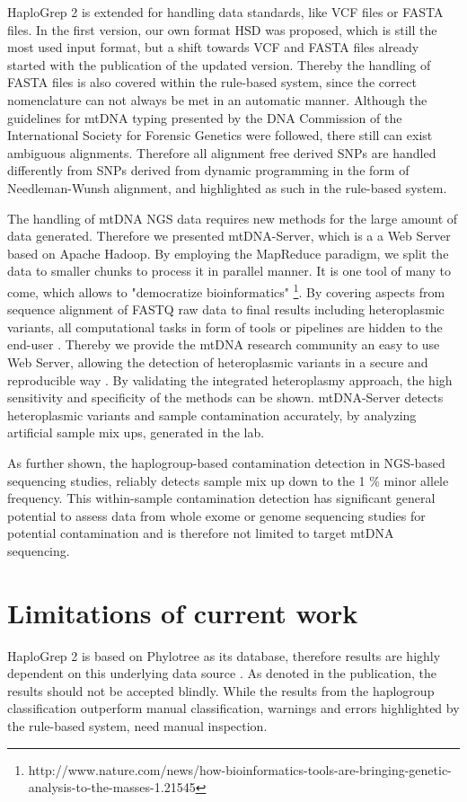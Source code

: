 HaploGrep 2 is extended for handling data standards, like VCF files or FASTA files. In the first version, our own format HSD was proposed, which is still the most used input format, but a shift towards VCF and FASTA files already started with the publication of the updated version. Thereby the handling of FASTA files is also covered within the rule-based system, since the correct nomenclature can not always be met in an automatic manner.  Although the guidelines for mtDNA typing presented by the DNA Commission of the International Society for Forensic Genetics \cite{Parson2014} were followed, there still can exist ambiguous alignments. Therefore all alignment free derived SNPs are handled differently from SNPs derived from dynamic programming in the form of Needleman-Wunsh alignment, and highlighted as such in the rule-based system.

The handling of mtDNA NGS data requires new methods for the large amount of data generated. Therefore we presented mtDNA-Server, which is a a Web 
Server based on Apache Hadoop. By employing the MapReduce paradigm, we split the data to smaller chunks to process it in parallel manner. It is one tool of many to come, which allows to "democratize bioinformatics" \footnote{http://www.nature.com/news/how-bioinformatics-tools-are-bringing-genetic-analysis-to-the-masses-1.21545}. By covering aspects from sequence alignment of FASTQ raw data to final results including heteroplasmic variants, all computational tasks in form of tools or pipelines are hidden to the end-user \cite{Weissensteiner2016b}.  Thereby we provide the mtDNA research community an easy to use Web Server, allowing the detection of heteroplasmic variants in a secure and reproducible way \cite{Weissensteiner2016b}. By validating the integrated heteroplasmy approach, the high sensitivity and specificity of the methods can be shown. mtDNA-Server detects heteroplasmic variants and sample contamination accurately, by analyzing artificial sample mix ups, generated in the lab.

As further shown, the haplogroup-based contamination detection in NGS-based sequencing studies, reliably detects sample mix up down to the 1 \% minor allele frequency. 
This within-sample contamination detection has significant general potential to assess data from whole exome or genome sequencing studies for potential contamination and is therefore not limited to target mtDNA sequencing. 

\section{Limitations of current work}
\label{disc:sec2}
HaploGrep 2 is based on Phylotree as its database, therefore results are highly dependent on this underlying data source \cite{Weissensteiner2016a}. As denoted in the publication, the results should not be accepted blindly. While the results from the haplogroup classification outperform manual classification, warnings and errors highlighted by the rule-based system, need manual inspection. 

